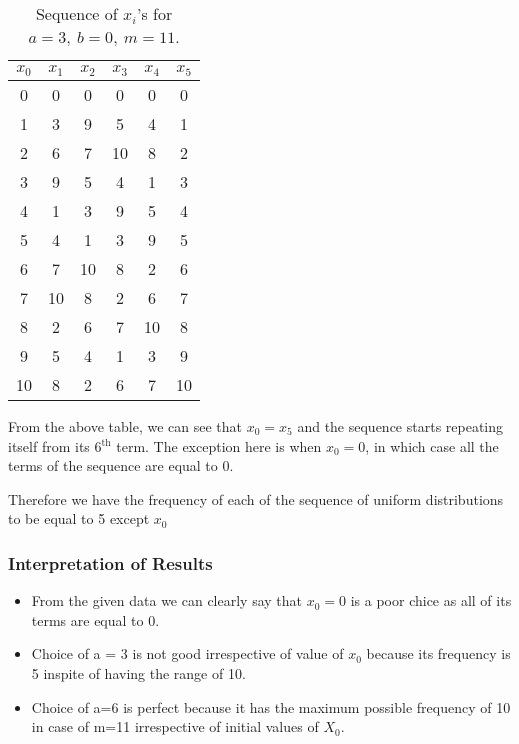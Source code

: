 \documentclass[10pt]{article}
\begin{document}
\begin{enumerate}
\begin{table}[H]
\begin{center}
\begin{tabular}{|c|c|c|c|c|c|}
\hline
\rule{0pt}{3ex} $x_0$ & $x_1$ & $x_2$ & $x_3$  & $x_4$ & $x_5$ \\
\hline
0 & 0 & 0 & 0 & 0 & 0 \\
\hline
1 & 3 & 9 & 5 & 4 & 1 \\
\hline
2 & 6 & 7 & 10 & 8 & 2 \\
\hline
3 & 9 & 5 & 4 & 1 & 3 \\
\hline
4 & 1 & 3 & 9 & 5 & 4 \\
\hline
5 & 4 & 1 & 3 & 9 & 5 \\
\hline
6 & 7 & 10 & 8 & 2 & 6 \\
\hline
7 & 10 & 8 & 2 & 6 & 7 \\
\hline
8 & 2 & 6 & 7 & 10 & 8 \\
\hline
9 & 5 & 4 & 1 & 3 & 9 \\
\hline
10 & 8 & 2 & 6 & 7 & 10 \\
\hline
\end{tabular}
\end{center}
\caption{Sequence of $x_i$'s for $a = 3,\: b = 0,\: m = 11$.}
\label{tab:q1_seq2}
\end{table}
\medskip

From the above table, we can see that $x_0 = x_5$ and  the sequence starts repeating itself from its 6$^{\textrm{th}}$ term. The exception here is when $x_0 = 0$, in which case all the terms of the sequence are equal to 0.\medskip 

Therefore we have the frequency of each of the sequence of uniform distributions to be equal to 5 except $x_0$

\end{enumerate}

\subsubsection{Interpretation of Results}
\begin{itemize}
\item From the given data we can clearly say that $x_0 = 0 $ is a poor chice as all of its terms are equal to 0.
\item Choice of a = 3 is not good irrespective of value of $x_0$ because its frequency is 5 inspite of having the range of 10.
\item Choice of a=6 is perfect because it has the maximum possible frequency of 10 in case of m=11 irrespective of initial values of $X_0$. 
\end{itemize}
\end{document}
